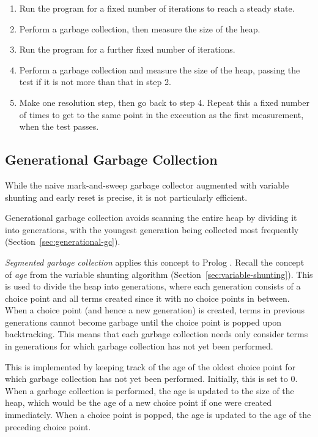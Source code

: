 \begin{enumerate}
\item Run the program for a fixed number of iterations to reach a steady state.
\item Perform a garbage collection, then measure the size of the heap.
\item Run the program for a further fixed number of iterations.
\item Perform a garbage collection and measure the size of the heap, passing the test if it is not more than that in step 2.
\item Make one resolution step, then go back to step 4. Repeat this a fixed number of times to get to the same point in the execution as the first measurement, when the test passes.
\end{enumerate}

\subsection{Generational Garbage Collection}

\label{sec:implementation-generational-gc}

While the naive mark-and-sweep garbage collector augmented with variable shunting and early reset is precise, it is not particularly efficient.

Generational garbage collection avoids scanning the entire heap by dividing it into generations, with the youngest generation being collected most frequently (Section~\ref{sec:generational-gc}).

\emph{Segmented garbage collection} applies this concept to Prolog \cite{applebyGarbargecollectionProlog1988}. Recall the concept of \emph{age} from the variable shunting algorithm (Section~\ref{sec:variable-shunting}). This is used to divide the heap into generations, where each generation consists of a choice point and all terms created since it with no choice points in between. When a choice point (and hence a new generation) is created, terms in previous generations cannot become garbage until the choice point is popped upon backtracking. This means that each garbage collection needs only consider terms in generations for which garbage collection has not yet been performed.

This is implemented by keeping track of the age of the oldest choice point for which garbage collection has not yet been performed. Initially, this is set to 0. When a garbage collection is performed, the age is updated to the size of the heap, which would be the age of a new choice point if one were created immediately. When a choice point is popped, the age is updated to the age of the preceding choice point.

